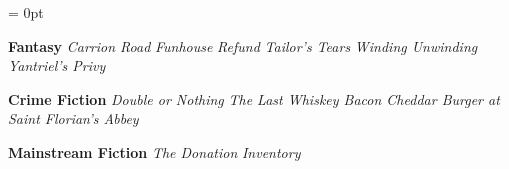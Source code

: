 
\begingroup

\def\genre#1{{\bigskip\bf#1}}
\def\genrebook#1{{\smallskip\it#1}}

\parindent = 0pt

\genre{Fantasy}
  \genrebook{Carrion Road}
  \genrebook{Funhouse}
  \genrebook{Refund}
  \genrebook{Tailor's Tears}
  \genrebook{Winding Unwinding}
  \genrebook{Yantriel's Privy}

\genre{Crime Fiction}
  \genrebook{Double or Nothing}
  \genrebook{The Last Whiskey Bacon Cheddar Burger at Saint Florian's Abbey}

\genre{Mainstream Fiction}
  \genrebook{The Donation}
  \genrebook{Inventory}

\endgroup
